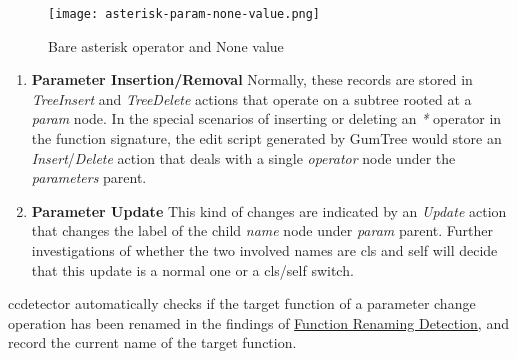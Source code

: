 \begin{figure}
	\caption{Bare asterisk operator and None value}
	\label{fig:star-none}
	\texttt{[image: asterisk-param-none-value.png]}
\end{figure}

\begin{enumerate}
	\item \textbf{Parameter Insertion/Removal} Normally, these records are stored in \textit{TreeInsert} and \textit{TreeDelete} actions that operate on a subtree rooted at a \textit{param} node. In the special scenarios of inserting or deleting an \textit{*} operator in the function signature, the edit script generated by GumTree would store an \textit{Insert}/\textit{Delete} action that deals with a single \textit{operator} node under the \textit{parameters} parent.
	\item \textbf{Parameter Update} This kind of changes are indicated by an \textit{Update} action that changes the label of the child \textit{name} node under \textit{param} parent. Further investigations of whether the two involved names are cls and self will decide that this update is a normal one or a cls/self switch.
\end{enumerate}

ccdetector automatically checks if the target function of a parameter change operation has been renamed in the findings of \hyperref[subsec:func-rename-detect]{Function Renaming Detection}, and record the current name of the target function.

%	

